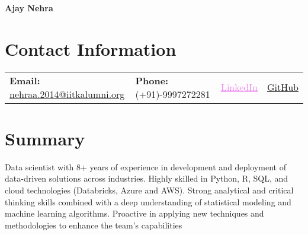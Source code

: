 \documentclass[a4paper,10pt]{article}
\begin{document}
\begin{center}
    \textbf{\huge Ajay Nehra}
\end{center}



\section*{Contact Information}
\noindent
\begin{tabular*}{\linewidth}{@{\extracolsep{\fill}}lllr@{}}
    \textbf{Email:} \href{mailto:nehraa.2014@iitkalumni.org}{nehraa.2014@iitkalumni.org} &
    \textbf{Phone:} (+91)-9997272281 &
    \href{https://www.linkedin.com/in/ajay-n-575bba23/}{\textcolor{violet}{\underline{LinkedIn}}} &
    \href{https://github.com/ajaynehra}{\textcolor{black!60!green}{\underline{GitHub}}}
\end{tabular*}





\section*{Summary}
Data scientist with 8+ years of experience in development and deployment of data-driven solutions across industries. Highly skilled in Python, R, SQL, and cloud technologies (Databricks, Azure and AWS). Strong analytical and critical thinking skills combined with a deep understanding of statistical modeling and machine learning algorithms. Proactive in  applying new techniques and methodologies to enhance the team's capabilities
\end{document}
